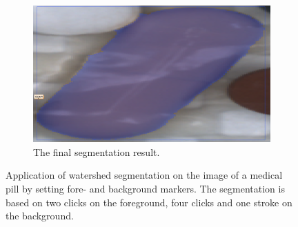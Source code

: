 \begin{figure}
\begin{subfigure}[t]{0.45\textwidth}
		\centering
		\includegraphics[width=\textwidth]{figures/chap32_watershed_application6.png}
		\caption{
			The final segmentation result.\newline	
		} \label{fig:ch3:sec3:application6}
	\end{subfigure}
	\caption [Watershed User Interaction]{
		Application of watershed segmentation on the image of a medical pill by setting fore- and background markers.
		The segmentation is based on two clicks on the foreground, four clicks and one stroke on the background.
	} \label{fig:ch3:sec2:application}
\end{figure}
